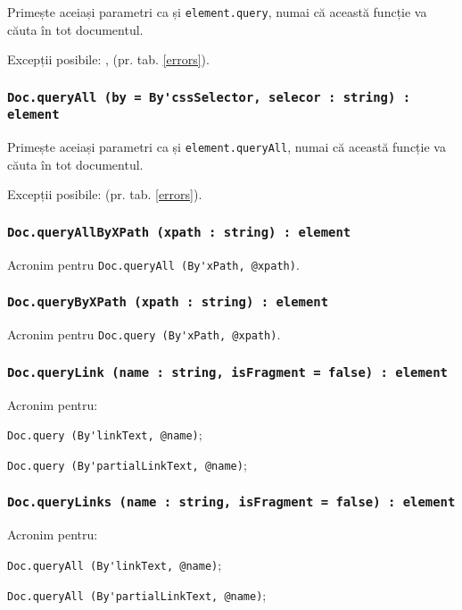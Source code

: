 Primește aceiași parametri ca și  \lstinline|element.query|, numai că această funcție va căuta în tot documentul.

Excepții posibile: ,  (pr. tab. \ref{errors}).

\subsubsection{\lstinline|Doc.queryAll (by = By'cssSelector, selecor : string) : element|}

Primește aceiași parametri ca și \lstinline|element.queryAll|, numai că această funcție va căuta în tot documentul.

Excepții posibile:  (pr. tab. \ref{errors}).

\subsubsection{\lstinline|Doc.queryAllByXPath (xpath : string) : element|}

Acronim pentru \lstinline|Doc.queryAll (By'xPath, @xpath)|.

\subsubsection{\lstinline|Doc.queryByXPath (xpath : string) : element|}

Acronim pentru \lstinline|Doc.query (By'xPath, @xpath)|.

\subsubsection{\lstinline|Doc.queryLink (name : string, isFragment = false) : element|}

Acronim pentru:
\begin{icItems}
	\item \lstinline|Doc.query (By'linkText, @name)|;
	\item \lstinline|Doc.query (By'partialLinkText, @name)|;
\end{icItems}

\subsubsection{\lstinline|Doc.queryLinks (name : string, isFragment = false) : element|}

Acronim pentru:
\begin{icItems}
	\item \lstinline|Doc.queryAll (By'linkText, @name)|;
	\item \lstinline|Doc.queryAll (By'partialLinkText, @name)|;
\end{icItems}


